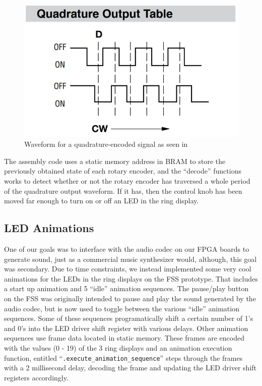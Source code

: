 \documentclass[conference]{IEEEtran}
\begin{document}
\begin{figure}[h]
    \centering
    \includegraphics[scale=0.4]{./resources/figures/quadrature_output_table.jpg}
    \caption{Waveform for a quadrature-encoded signal as seen in \cite{cite:rotary_encoders}}
    \label{fig:quadrature_encoding}
\end{figure}

The assembly code uses a static memory address in BRAM to store the previously obtained state of each rotary encoder, and the ``decode'' functions works to detect whether or not the rotary encoder has traversed a whole period of the quadrature output waveform. If it has, then the control knob has been moved far enough to turn on or off an LED in the ring display.

\subsection{LED Animations}
One of our goals was to interface with the audio codec on our FPGA boards to generate sound, just as a commercial music synthesizer would, although, this goal was secondary. Due to time constraints, we instead implemented some very cool animations for the LEDs in the ring displays on the FSS prototype. That includes a start up animation and 5 ``idle'' animation sequences. The pause/play button on the FSS was originally intended to pause and play the sound generated by the audio codec, but is now used to toggle between the various ``idle'' animation sequences. Some of these sequences programatically shift a certain number of 1's and 0's into the LED driver shift register with various delays. Other animation sequences use frame data located in static memory. These frames are encoded with the values (0 - 19) of the 3 ring displays and an animation execution function, entitled ``\verb|.execute_animation_sequence|'' steps through the frames with a 2 millisecond delay, decoding the frame and updating the LED driver shift registers accordingly.
\end{document}
